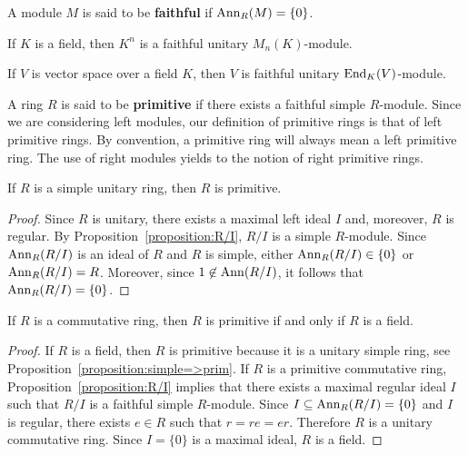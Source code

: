 

A module $M$ is said to be \textbf{faithful} if $\operatorname{Ann}_R(M)=\{0\}$. 

\begin{example}
	If $K$ is a field, then $K^n$ is a faithful unitary $M_n(K)$-module.
\end{example}

\begin{example}
	If $V$ is vector space over a field $K$, then $V$ is faithful unitary $\operatorname{End}_K(V)$-module.
\end{example}

A ring $R$ is said to be \textbf{primitive} if there exists a faithful simple $R$-module. Since 
we are considering left modules, our definition of primitive rings is that of left primitive rings. 
By convention, a primitive ring
will always mean a left primitive ring. 
The use 
of right modules yields to the notion of right primitive rings.  

\begin{proposition}
	\label{proposition:simple=>prim}
	If $R$ is a simple unitary ring, then $R$ is primitive. 
\end{proposition}

\begin{proof}
	Since $R$ is unitary, there exists a maximal left ideal $I$ and, moreover, $R$ is regular.
	By Proposition~\ref{proposition:R/I}, $R/I$ is a simple $R$-module. 
	Since $\operatorname{Ann}_R(R/I)$ is an ideal of $R$ and $R$ is simple, either $\operatorname{Ann}_R(R/I)\in\{0\}$ or 
	$\operatorname{Ann}_R(R/I)=R$. Moreover, since 
	$1\not\in\operatorname{Ann}(R/I)$, it follows that 
	$\operatorname{Ann}_R(R/I)=\{0\}$. 
\end{proof}

\begin{proposition}
	\label{proposition:prim+conm=cuerpo}
	If $R$ is a commutative ring, then $R$ is primitive if and only if $R$ is a field. 
\end{proposition}

\begin{proof}
	If $R$ is a field, then $R$ is primitive because it is a unitary simple ring, see  
	Proposition~\ref{proposition:simple=>prim}. If $R$ is a primitive commutative ring, Proposition~\ref{proposition:R/I} implies that there exists a maximal regular ideal $I$
	such that  
	$R/I$ is a faithful simple $R$-module. 
	Since $I\subseteq \operatorname{Ann}_R(R/I)=\{0\}$ and $I$ is regular, there exists $e\in R$ such that 
	$r=re=er$. Therefore $R$ is a unitary commutative ring. Since $I=\{0\}$ is a maximal ideal, 
	$R$ is a field. 
\end{proof}

